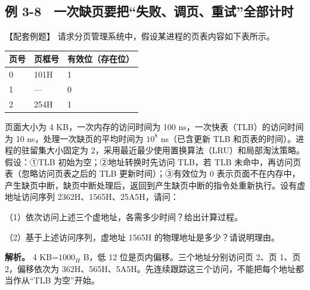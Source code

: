 \subsection{例 3-8　一次缺页要把``失败、调页、重试''全部计时}\label{OS03-ex5-8}

\begin{example}[配套例题]

【配套例题】 请求分页管理系统中，假设某进程的页表内容如下表所示。

\begin{wideblock}

\par\medskip\noindent\begin{minipage}{\linewidth}\fontsize{9.3}{12}\selectfont\begin{tabularx}{\linewidth}{@{}YYY@{}}
\toprule\noalign{}
页号 & 页框号 & 有效位（存在位） \\
\midrule\noalign{}


0 & 101H & 1 \\
1 & --- & 0 \\
2 & 254H & 1 \\
\bottomrule\end{tabularx}
\end{minipage}\par\medskip

\end{wideblock}

页面大小为 4 KB，一次内存的访问时间为 100 ns，一次快表（TLB）的访问时间为 10 ns，处理一次缺页的平均时间为 \(10^8\) ns（已含更新 TLB 和页表的时间）。进程的驻留集大小固定为 2，采用最近最少使用置换算法（LRU）和局部淘汰策略。假设：{\SNsymbolfont ①}TLB 初始为空；{\SNsymbolfont ②}地址转换时先访问 TLB，若 TLB 未命中，再访问页表（忽略访问页表之后的 TLB 更新时间）；{\SNsymbolfont ③}有效位为 0 表示页面不在内存中，产生缺页中断，缺页中断处理后，返回到产生缺页中断的指令处重新执行。设有虚地址访问序列 2362H、1565H、25A5H，请问：

（1）依次访问上述三个虚地址，各需多少时间？给出计算过程。

（2）基于上述访问序列，虚地址 1565H 的物理地址是多少？请说明理由。

\end{example}

\textbf{解析。} 4 KB=\(1000_H\) B，低 12 位是页内偏移。三个地址分别访问页 2、页 1、页 2，偏移依次为 362H、565H、5A5H。先连续跟踪这三个访问，不能把每个地址都当作从``TLB 为空''开始。

